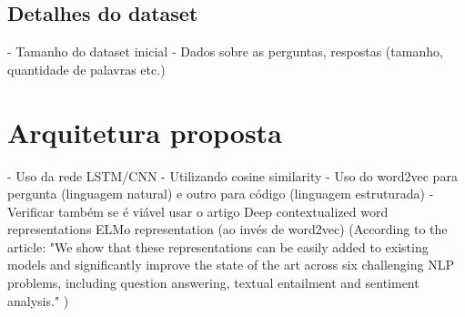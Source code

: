 \subsection{Detalhes do dataset}

 - Tamanho do dataset inicial
 - Dados sobre as perguntas, respostas (tamanho, quantidade de palavras etc.)

\section{Arquitetura proposta} 

- Uso da rede LSTM/CNN 
       - Utilizando cosine similarity
       - Uso do word2vec para pergunta (linguagem natural) e outro para código (linguagem estruturada) - Verificar também se é viável usar o artigo Deep contextualized word representations ELMo representation (ao invés de word2vec) (According to the article: "We show that
these representations can be easily added to
existing models and significantly improve the
state of the art across six challenging NLP
problems, including question answering, textual entailment and sentiment analysis." )





